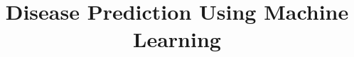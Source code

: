 \documentclass[twocolumn]{bmcart}%
\begin{document}
\begin{frontmatter}

\begin{fmbox}


\title{Disease Prediction Using Machine Learning}


\author[
   addressref={aff1},                   %
   corref={aff1},                       %
   email={joel.rodarter@uanl.edu.mx}   %
]{ }



\address[id=aff1]{%
  , %
  ,                              %
}



\end{fmbox}
\end{frontmatter}
\end{document}
